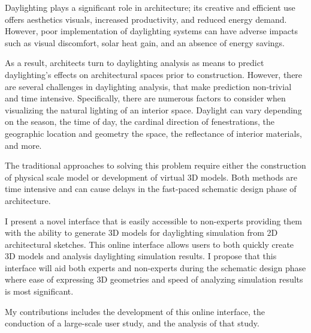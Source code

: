 Daylighting plays a significant role in architecture; its creative and efficient use offers aesthetics visuals, increased productivity, and reduced energy demand. However, poor implementation of daylighting systems can have adverse impacts such as visual discomfort, solar heat gain, and an absence of energy savings. 

As a result, architects turn to daylighting analysis as means to predict daylighting's effects on architectural spaces prior to construction. However, there are several challenges in daylighting analysis, that make prediction non-trivial and time intensive. Specifically, there are numerous factors to consider when visualizing the natural lighting of an interior space. Daylight can vary depending on the season, the time of day, the cardinal direction of fenestrations,  the geographic location and geometry the space,  the reflectance of interior materials, and more.  

The traditional approaches to solving this problem require either the construction of physical scale model or development of virtual 3D models. Both methods are time intensive and can cause delays in the fast-paced schematic design phase of architecture.  

I present a novel interface that is easily accessible to non-experts providing them with the ability to generate 3D models for daylighting simulation from 2D architectural sketches. This online interface allows users to both quickly create 3D models and analysis daylighting simulation results. I propose that this interface will aid both experts and non-experts during the schematic design phase where ease of expressing 3D geometries and speed of analyzing simulation results is most significant. 

My contributions includes the development of this online interface, the conduction of a large-scale user study, and the analysis of that study.

